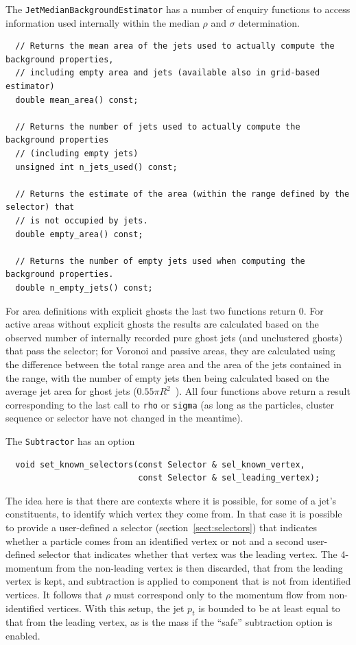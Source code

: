 \documentclass[12pt,a4]{article}
\newcommand{\ttt}[1]{{\small\texttt{#1}}}
\begin{document}
The \ttt{JetMedianBackgroundEstimator} has a number of enquiry
functions to access information used internally within the median
$\rho$ and $\sigma$ determination.
\begin{lstlisting}
  // Returns the mean area of the jets used to actually compute the background properties,
  // including empty area and jets (available also in grid-based estimator)
  double mean_area() const;
   
  // Returns the number of jets used to actually compute the background properties
  // (including empty jets)
  unsigned int n_jets_used() const;
   
  // Returns the estimate of the area (within the range defined by the selector) that
  // is not occupied by jets.
  double empty_area() const;
   
  // Returns the number of empty jets used when computing the background properties. 
  double n_empty_jets() const;
\end{lstlisting}
For area definitions with explicit ghosts the last two functions
return $0$.
%
For active areas without explicit ghosts the results are calculated
based on the observed number of internally recorded pure ghost jets
(and unclustered ghosts) that pass the selector; for Voronoi and
passive areas, they are calculated using the difference between the
total range area and the area of the jets contained in the range, with
the number of empty jets then being calculated based on the average
jet area for ghost jets ($0.55\pi R^2$~\cite{CSSAreas}).
%
All four functions above return a result corresponding to the last call
to \ttt{rho} or \ttt{sigma} (as long as the particles, cluster sequence or
selector have not changed in the meantime).

The \ttt{Subtractor} has an option
\begin{lstlisting}
  void set_known_selectors(const Selector & sel_known_vertex,
                           const Selector & sel_leading_vertex);
\end{lstlisting}
The idea here is that there are contexts where it is possible, for
some of a jet's constituents, to identify which vertex they come from.
%
In that case it is possible to provide a user-defined a selector
(section~\ref{sect:selectors}) that indicates whether a particle comes
from an identified vertex or not and a second user-defined selector
that indicates whether that vertex was the leading vertex.
%
The 4-momentum from the non-leading vertex is then discarded, that
from the leading vertex is kept, and subtraction is applied to
component that is not from identified vertices.
%
It follows that $\rho$ must correspond only to the momentum flow from
non-identified vertices.
%
With this setup, the jet $p_t$ is bounded to be at least equal to that
from the leading vertex, as is the mass if the ``safe'' subtraction
option is enabled.
\end{document}
